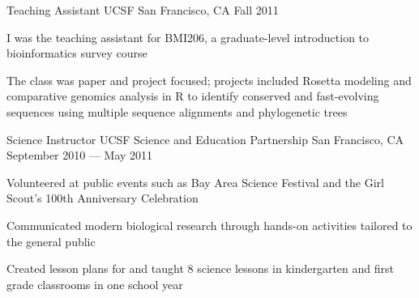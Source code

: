 \begin{cventries}
  \cventry
  {Teaching Assistant} %
  {UCSF} %
  {San Francisco, CA} %
  {Fall 2011} %
  {
    \begin{cvitems} %
    \item I was the teaching assistant for BMI206, a graduate-level introduction to bioinformatics survey course
    \item The class was paper and project focused; projects included Rosetta modeling and comparative genomics analysis in R to identify conserved and fast-evolving sequences using multiple sequence alignments and phylogenetic trees
    \end{cvitems}
  }

  \cventry
  {Science Instructor} %
  {UCSF Science and Education Partnership} %
  {San Francisco, CA} %
  {September 2010 --- May 2011} %
  {
    \begin{cvitems} %
    \item Volunteered at public events such as Bay Area Science Festival and the Girl Scout's 100th Anniversary Celebration
    \item Communicated modern biological research through hands-on activities tailored to the general public
    \item Created lesson plans for and taught 8 science lessons in kindergarten and first grade classrooms in one school year
    \end{cvitems}
  }

\end{cventries}
